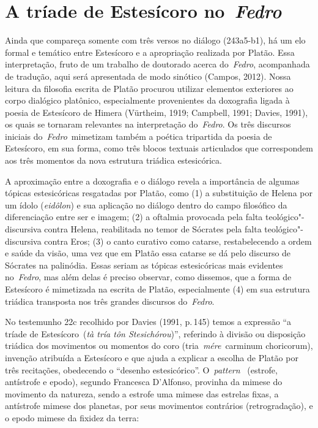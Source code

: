  

\section{A tríade de Estesícoro no~\emph{Fedro}}

 

Ainda que compareça somente com três versos no diálogo (243a5-b1), há um
elo formal e temático entre Estesícoro e a apropriação realizada por
Platão. Essa interpretação, fruto de um trabalho de doutorado acerca
do~\emph{Fedro}, acompanhada de tradução, aqui será apresentada de modo
sinótico (Campos, 2012). Nossa leitura da filosofia escrita de Platão
procurou utilizar elementos exteriores ao corpo dialógico platônico,
especialmente provenientes da doxografia ligada à poesia de Estesícoro
de Himera (Vürtheim, 1919; Campbell, 1991; Davies, 1991), os quais se
tornaram relevantes na interpretação do~\emph{Fedro}. Os três discursos
iniciais do~\emph{Fedro}~mimetizam também a poética tripartida da poesia
de Estesícoro, em sua forma, como três blocos textuais articulados que
correspondem aos três momentos da nova estrutura triádica estesicórica.

A aproximação entre a doxografia e o diálogo revela a importância de
algumas tópicas estesicóricas resgatadas por Platão, como (1) a
substituição de Helena por um ídolo (\emph{eidôlon}) e sua aplicação no
diálogo dentro do campo filosófico da diferenciação entre ser e imagem; 
(2) a oftalmia provocada pela falta teológico"-discursiva contra Helena,
reabilitada no temor de Sócrates pela falta teológico"-discursiva contra
Eros; (3) o canto curativo como catarse, restabelecendo a ordem e saúde
da visão, uma vez que em Platão essa catarse se dá pelo discurso de
Sócrates na palinódia. Essas seriam as tópicas estesicóricas mais
evidentes no~\emph{Fedro}, mas além delas é preciso observar, como
dissemos, que a forma de Estesícoro é mimetizada na escrita de Platão,
especialmente (4) em sua estrutura triádica transposta nos três grandes
discursos do~\emph{Fedro}.

No testemunho 22c recolhido por Davies (1991, p.\,145) temos a expressão
``a tríade de Estesícoro~(\emph{tà tría tôn Stesichórou})'',
referindo à divisão ou disposição triádica dos movimentos ou momentos do
coro (tria~\emph{mére}~carminum choricorum), invenção atribuída a
Estesícoro e que ajuda a explicar a escolha de Platão por três recitações,
obedecendo o ``desenho estesicórico''. O~\emph{pattern}~ (estrofe,
antístrofe e epodo), segundo Francesca D'Alfonso, provinha da mimese do
movimento da natureza, sendo a estrofe uma mimese das estrelas fixas, a
antístrofe mimese dos planetas, por seus movimentos contrários
(retrogradação), e o epodo mimese da fixidez da terra:


